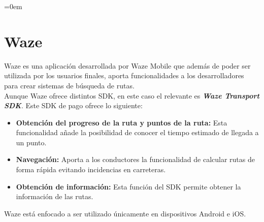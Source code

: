 \parindent=0em
\section{Waze}
\noindent


Waze es una aplicación desarrollada por Waze Mobile que además de poder ser utilizada por los usuarios finales, aporta funcionalidades a los desarrolladores para crear sistemas de búsqueda de rutas.\\

Aunque Waze ofrece distintos SDK, en este caso el relevante es \textbf{\textit{Waze Transport SDK}}. Este SDK de pago ofrece lo siguiente:

\begin{itemize}
    \item \textbf{Obtención del progreso de la ruta y puntos de la ruta:} Esta funcionalidad añade la posibilidad de conocer el tiempo estimado de llegada a un punto.
    
    \item \textbf{Navegación:} Aporta a los conductores la funcionalidad de calcular rutas de forma rápida evitando incidencias en carreteras.

    \item \textbf{Obtención de información:} Esta función del SDK permite obtener la información de las rutas.
\end{itemize}

Waze está enfocado a ser utilizado únicamente en dispositivos Android e iOS.